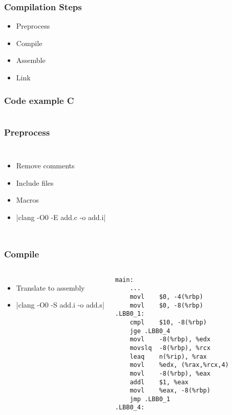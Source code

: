 \begin{frame}
    \frametitle{Compilation Steps}
    \begin{itemize}
        \item Preprocess
        \item Compile
        \item Assemble
        \item Link
    \end{itemize}
\end{frame}

\begin{frame}
    \frametitle{Code example C}
    \inputminted{c}{add.c}
\end{frame}


\begin{frame}
    \frametitle{Preprocess}
    
    \begin{columns}
\begin{itemize}
        \item Remove comments
        \item Include files
        \item Macros
        \item {}|clang -O0 -E add.c -o add.i|
    \end{itemize}
    \inputminted[firstline=8]{c}{add.i}
    \end{columns}
\end{frame}

\begin{frame}[fragile]
    \frametitle{Compile}
    \begin{columns}
\begin{itemize}
        \item Translate to assembly
        \item {}|clang -O0 -S add.i -o add.s|
    \end{itemize}
    \begin{verbatim}
main:
    ...
    movl	$0, -4(%rbp)
    movl	$0, -8(%rbp)
.LBB0_1:
    cmpl	$10, -8(%rbp)
    jge	.LBB0_4
    movl	-8(%rbp), %edx
    movslq	-8(%rbp), %rcx
    leaq	n(%rip), %rax
    movl	%edx, (%rax,%rcx,4)
    movl	-8(%rbp), %eax
    addl	$1, %eax
    movl	%eax, -8(%rbp)
    jmp	.LBB0_1
.LBB0_4:
    \end{verbatim}
    \end{columns}
\end{frame}


